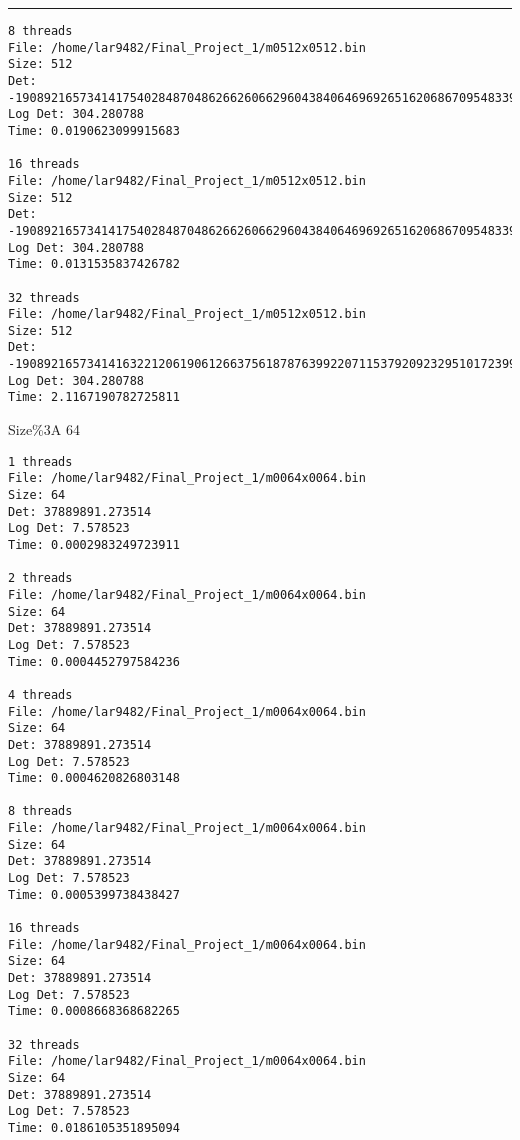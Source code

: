 \documentclass[letter, 12pt]{article}
\newenvironment{question}[1]{%
    \vspace{.2in}%
        \noindent{\bf #1}%
    \vspace{0.3em} \hrule \vspace{.1in}%
}{}
\begin{document}
\begin{question}{\large Appendix}
\begin{lstlisting}[style=CStyle]
8 threads
File: /home/lar9482/Final_Project_1/m0512x0512.bin
Size: 512
Det: -19089216573414175402848704862662606629604384064696926516206867095483399648215847664531539449704224231810937688998951654434357161658255680520318519809065183187963540686340693736590147786377522792937096088012718055779547794390196215572602726441464200831399030132597315062079475565516456265977719909649481728.000000
Log Det: 304.280788
Time: 0.0190623099915683

16 threads
File: /home/lar9482/Final_Project_1/m0512x0512.bin
Size: 512
Det: -19089216573414175402848704862662606629604384064696926516206867095483399648215847664531539449704224231810937688998951654434357161658255680520318519809065183187963540686340693736590147786377522792937096088012718055779547794390196215572602726441464200831399030132597315062079475565516456265977719909649481728.000000
Log Det: 304.280788
Time: 0.0131535837426782

32 threads
File: /home/lar9482/Final_Project_1/m0512x0512.bin
Size: 512
Det: -19089216573414163221206190612663756187876399220711537920923295101723991063332776148345675991671596149792105336486127622803211872397420451196356188305197624965479420295523919322493022840786235454450026725445657614780055945367222623465605319697870518648444510796390299027405971685169522413691982419756843008.000000
Log Det: 304.280788
Time: 2.1167190782725811
\end{lstlisting}

Size\%3A 64
\begin{lstlisting}[style=CStyle]
1 threads
File: /home/lar9482/Final_Project_1/m0064x0064.bin
Size: 64
Det: 37889891.273514
Log Det: 7.578523
Time: 0.0002983249723911

2 threads
File: /home/lar9482/Final_Project_1/m0064x0064.bin
Size: 64
Det: 37889891.273514
Log Det: 7.578523
Time: 0.0004452797584236

4 threads
File: /home/lar9482/Final_Project_1/m0064x0064.bin
Size: 64
Det: 37889891.273514
Log Det: 7.578523
Time: 0.0004620826803148

8 threads
File: /home/lar9482/Final_Project_1/m0064x0064.bin
Size: 64
Det: 37889891.273514
Log Det: 7.578523
Time: 0.0005399738438427

16 threads
File: /home/lar9482/Final_Project_1/m0064x0064.bin
Size: 64
Det: 37889891.273514
Log Det: 7.578523
Time: 0.0008668368682265

32 threads
File: /home/lar9482/Final_Project_1/m0064x0064.bin
Size: 64
Det: 37889891.273514
Log Det: 7.578523
Time: 0.0186105351895094
\end{lstlisting}


\end{question}
\end{document}
